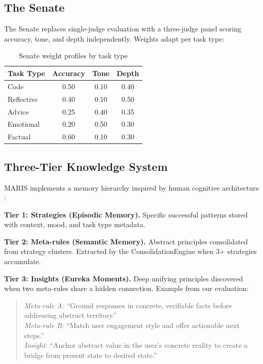 \documentclass[11pt,a4paper]{article}
\begin{document}
\subsection{The Senate}

The Senate replaces single-judge evaluation with a three-judge panel scoring accuracy, tone, and depth independently. Weights adapt per task type:

\begin{table}[H]
\centering
\caption{Senate weight profiles by task type}
\begin{tabular}{lccc}
\toprule
\textbf{Task Type} & \textbf{Accuracy} & \textbf{Tone} & \textbf{Depth} \\
\midrule
Code & 0.50 & 0.10 & 0.40 \\
Reflective & 0.40 & 0.10 & 0.50 \\
Advice & 0.25 & 0.40 & 0.35 \\
Emotional & 0.20 & 0.50 & 0.30 \\
Factual & 0.60 & 0.10 & 0.30 \\
\bottomrule
\end{tabular}
\end{table}

\subsection{Three-Tier Knowledge System}

MARIS implements a memory hierarchy inspired by human cognitive architecture \cite{memorysystems2000}:

\textbf{Tier 1: Strategies (Episodic Memory).} Specific successful patterns stored with context, mood, and task type metadata.

\textbf{Tier 2: Meta-rules (Semantic Memory).} Abstract principles consolidated from strategy clusters. Extracted by the ConsolidationEngine when 3+ strategies accumulate.

\textbf{Tier 3: Insights (Eureka Moments).} Deep unifying principles discovered when two meta-rules share a hidden connection. Example from our evaluation:

\begin{quote}
\textit{Meta-rule A:} ``Ground responses in concrete, verifiable facts before addressing abstract territory.''\\
\textit{Meta-rule B:} ``Match user engagement style and offer actionable next steps.''\\
\textit{Insight:} ``Anchor abstract value in the user's concrete reality to create a bridge from present state to desired state.''
\end{quote}
\end{document}
